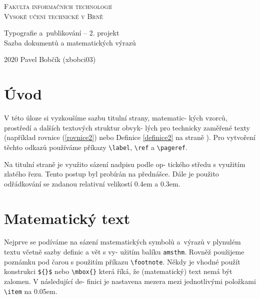 \documentclass[twocolumn, a4paper, 11pt]{article}
\date{}
\begin{document}
\begin{titlepage}
    \begin{center}
        \thispagestyle{empty}
        {\Huge
        \textsc{Fakulta informačních technologií\\[0.4em]
        Vysoké učení technické v Brně}}
        
        
        {\LARGE Typografie a~publikování -- 2. projekt\\[0.3em]
        Sazba dokumentů a matematických výrazů}
    \end{center}
{\Large 2020 \hfill Pavel Bobčík (xbobci03)}
\end{titlepage}

\newpage

\setcounter{page}{1}
\section*{Úvod}
V této úloze si vyzkoušíme sazbu titulní strany, matematic- kých vzorců, prostředí a dalších textových struktur obvyk- lých pro technicky zaměřené texty (například rovnice (\ref{rovnice2}) nebo Definice \ref{definice2} na straně \pageref{definice2}). Pro vytvoření těchto odkazů používáme příkazy \verb|\label|, \verb|\ref| a \verb|\pageref|.

Na titulní straně je využito sázení nadpisu podle op- tického středu s využitím zlatého řezu. Tento postup byl probírán na přednášce. Dále je použito odřádkování se zadanou relativní velikostí 0.4em a 0.3em.

\section{Matematický text}
Nejprve se podíváme na sázení matematických symbolů a~výrazů v plynulém textu včetně sazby definic a vět s vy- užitím balíku \texttt{amsthm}. Rovněž použijeme poznámku pod čarou s použitím příkazu \verb|\footnote|. Někdy je vhodné použít konstrukci \verb|${}$| nebo \verb|\mbox{}| která říká, že (matematický) text nemá být zalomen. V následující de- finici je nastavena mezera mezi jednotlivými položkami \verb|\item| na 0.05em.
\end{document}
